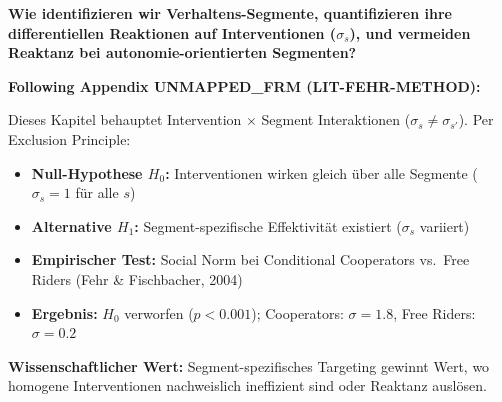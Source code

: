 
\begin{tcolorbox}[colback=red!5!white, colframe=red!75!black,
    title=Central Question]
\textbf{Wie identifizieren wir Verhaltens-Segmente, quantifizieren ihre differentiellen Reaktionen auf Interventionen ($\sigma_s$), und vermeiden Reaktanz bei autonomie-orientierten Segmenten?}
\end{tcolorbox}

\begin{tcolorbox}[colback=red!5!white, colframe=red!75!black,
    title=\textbf{Methodological Note: The Exclusion Principle (Appendix UNMAPPED_FRM)}]
\textbf{Following Appendix UNMAPPED_FRM (LIT-FEHR-METHOD):}

Dieses Kapitel behauptet Intervention $\times$ Segment Interaktionen ($\sigma_s \neq \sigma_{s'}$). Per Exclusion Principle:
\begin{itemize}[nosep]
    \item \textbf{Null-Hypothese $H_0$:} Interventionen wirken gleich über alle Segmente ($\sigma_s = 1$ für alle $s$)
    \item \textbf{Alternative $H_1$:} Segment-spezifische Effektivität existiert ($\sigma_s$ variiert)
    \item \textbf{Empirischer Test:} Social Norm bei Conditional Cooperators vs.\ Free Riders (Fehr \& Fischbacher, 2004)
    \item \textbf{Ergebnis:} $H_0$ verworfen ($p < 0.001$); Cooperators: $\sigma = 1.8$, Free Riders: $\sigma = 0.2$
\end{itemize}

\textbf{Wissenschaftlicher Wert:} Segment-spezifisches Targeting gewinnt Wert, wo homogene Interventionen nachweislich ineffizient sind oder Reaktanz auslösen.
\end{tcolorbox}


